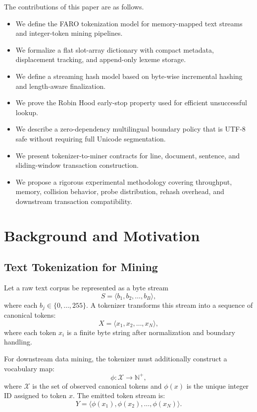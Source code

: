 \documentclass[11pt,a4paper]{article}
\newcommand{\Tokens}{\mathcal{X}}
\begin{document}
The contributions of this paper are as follows.

\begin{itemize}
\item We define the FARO tokenization model for memory-mapped text streams and integer-token mining pipelines.
\item We formalize a flat slot-array dictionary with compact metadata, displacement tracking, and append-only lexeme storage.
\item We define a streaming hash model based on byte-wise incremental hashing and length-aware finalization.
\item We prove the Robin Hood early-stop property used for efficient unsuccessful lookup.
\item We describe a zero-dependency multilingual boundary policy that is UTF-8 safe without requiring full Unicode segmentation.
\item We present tokenizer-to-miner contracts for line, document, sentence, and sliding-window transaction construction.
\item We propose a rigorous experimental methodology covering throughput, memory, collision behavior, probe distribution, rehash overhead, and downstream transaction compatibility.
\end{itemize}

\section{Background and Motivation}

\subsection{Text Tokenization for Mining}

Let a raw text corpus be represented as a byte stream
\[
S = \langle b_1,b_2,\dots,b_B\rangle,
\]
where each \(b_j\in\{0,\dots,255\}\). A tokenizer transforms this stream into a sequence of canonical tokens:
\[
X = \langle x_1,x_2,\dots,x_N\rangle,
\]
where each token \(x_i\) is a finite byte string after normalization and boundary handling.

For downstream data mining, the tokenizer must additionally construct a vocabulary map:
\[
\phi:\Tokens \rightarrow \mathbb{N}^+,
\]
where \(\Tokens\) is the set of observed canonical tokens and \(\phi(x)\) is the unique integer ID assigned to token \(x\). The emitted token stream is:
\[
Y=\langle \phi(x_1),\phi(x_2),\dots,\phi(x_N)\rangle.
\]
\end{document}
